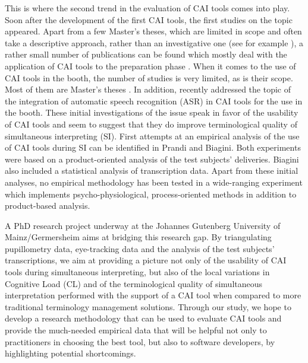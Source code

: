 \documentclass[output=paper]{langsci/langscibook}
\begin{document}
This is where the second trend in the evaluation of \textsc{CAI} tools comes into play. Soon after the development of the first \textsc{CAI} tools, the first studies on the topic appeared. Apart from a few Master’s theses, which are limited in scope and often take a descriptive approach, rather than an investigative one (see for example \citealt{DeMerulis2013}), a rather small number of publications can be found which mostly deal with the application of \textsc{CAI} tools to the preparation phase \citep{Xu2015, Fantinuoli2017a}. When it comes to the use of \textsc{CAI} tools in the booth, the number of studies is very limited, as is their scope. Most of them are Master’s theses \citep{Gacek2015, Biagini2015; Prandi2015a, Prandi2015b}. In addition, \citet{Fantinuoli2017b} recently addressed the topic of the integration of automatic speech recognition (\textsc{ASR}) in \textsc{CAI} tools for the use in the booth. These initial investigations of the issue speak in favor of the usability of \textsc{CAI} tools and seem to suggest that they do improve terminological quality of simultaneous interpreting (\textsc{SI}). First attempts at an empirical analysis of the use of \textsc{CAI} tools during \textsc{SI} can be identified in Prandi and Biagini. Both experiments were based on a product-oriented analysis of the test subjects’ deliveries. Biagini also included a statistical analysis of transcription data. Apart from these initial analyses, no empirical methodology has been tested in a wide-ranging experiment which implements psycho-physiological, process-oriented methods in addition to product-based analysis.

A PhD research project underway at the Johannes Gutenberg University of Mainz/Germersheim \citep{Prandi2016, Prandi2017a, Prandi2017b} aims at bridging this research gap. By triangulating pupillometry data, eye-tracking data and the analysis of the test subjects’ transcriptions, we aim at providing a picture not only of the usability of \textsc{CAI} tools during simultaneous interpreting, but also of the local variations in Cognitive Load (CL) and of the terminological quality of simultaneous interpretation performed with the support of a \textsc{CAI} tool when compared to more traditional terminology management solutions. Through our study, we hope to develop a research methodology that can be used to evaluate \textsc{CAI} tools and provide the much-needed empirical data that will be helpful not only to practitioners in choosing the best tool, but also to software developers, by highlighting potential shortcomings.
\end{document}
